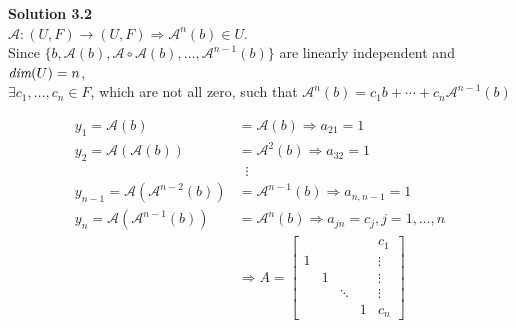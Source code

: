 \documentclass[a4paper,10.5pt]{article}
\def\dim{{\mbox{\em dim}}}
\newcommand{\A}{\mathcal{A}}
\begin{document}
{\bf Solution 3.2} \\

$\A:(U,F) \rightarrow (U,F) \Rightarrow \A^n(b) \in U$. \\
Since $\{b, {\A}(b), {\A} \circ {\A}(b), \ldots, {\A}^{n-1}(b)\}$ are linearly independent and $\dim(U) = n$, \\
$\exists c_1,\dots,c_n \in F$, which are not all zero, such that $\A^n(b) = c_1b + \cdots + c_n\A^{n-1}(b)$

\begin{align*}
y_1 = \A(b) &= \A(b) \Rightarrow a_{21} = 1 \\
y_2 = \A(\A(b)) &= \A^2(b) \Rightarrow a_{32} = 1\\
&\; \; \vdots \\
y_{n-1} = \A(\A^{n-2}(b)) &= \A^{n-1}(b) \Rightarrow a_{n,n-1} = 1 \\
y_n = \A(\A^{n-1}(b)) &= \A^n(b) \Rightarrow a_{jn} = c_j, j=1,\dots,n \\
&\Rightarrow A = \left[\begin{matrix}
 & & & & c_1\\
1 &  & & & \vdots \\
& 1 & & & \vdots\\
& & \ddots & & \vdots \\
& &  & 1 & c_n
\end{matrix}\right]
\end{align*}
\end{document}
